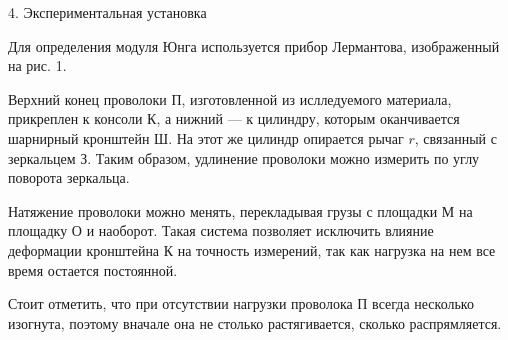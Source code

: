 \documentclass[12pt, a4paper]{article}
\begin{document}
\newpage
{\Large 4. Экспериментальная установка \\}

Для определения модуля Юнга используется прибор Лермантова, изображенный на рис. 1.


\noindent\begin{minipage}[c]{0.53\textwidth}
    \hspace{1cm}
    Верхний конец проволоки П, изготовленной из ислледуемого материала, прикреплен к консоли К,
    а нижний --- к цилиндру, которым оканчивается шарнирный кронштейн Ш. На этот же цилиндр опирается рычаг $r$, связанный
    с зеркальцем З. Таким образом, удлинение проволоки можно измерить по углу поворота зеркальца.

    Натяжение проволоки можно менять, перекладывая грузы с площадки М на площадку О и наоборот.
    Такая система позволяет исключить влияние деформации кронштейна К на точность измерений,
    так как нагрузка на нем все время остается постоянной.

    Стоит отметить, что при отсутствии нагрузки проволока П всегда несколько изогнута, поэтому 
    вначале она не столько растягивается, сколько распрямляется.

\end{minipage}
\end{document}
